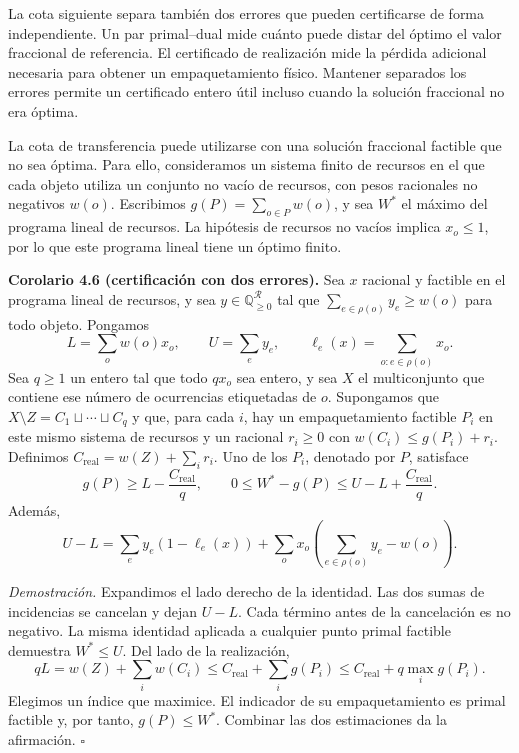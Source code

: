\documentclass[spanish,11pt,a4paper]{article}
\begin{document}
La cota siguiente separa también dos errores que pueden certificarse de
forma independiente. Un par primal--dual mide cuánto puede distar del
óptimo el valor fraccional de referencia. El certificado de realización
mide la pérdida adicional necesaria para obtener un empaquetamiento
físico. Mantener separados los errores permite un certificado entero
útil incluso cuando la solución fraccional no era óptima.

La cota de transferencia puede utilizarse con una solución fraccional
factible que no sea óptima. Para ello, consideramos un sistema finito de
recursos en el que cada objeto utiliza un conjunto no vacío de recursos,
con pesos racionales no negativos \(w(o)\). Escribimos
\(g(P)=\sum_{o\in P}w(o)\), y sea \(W^*\) el máximo del programa lineal
de recursos. La hipótesis de recursos no vacíos implica \(x_o\le1\), por
lo que este programa lineal tiene un óptimo finito.

\textbf{Corolario 4.6 (certificación con dos errores).} Sea \(x\)
racional y factible en el programa lineal de recursos, y sea
\(y\in\mathbb Q_{\ge0}^{\mathcal R}\) tal que
\(\sum_{e\in\rho(o)}y_e\ge w(o)\) para todo objeto. Pongamos \[
L=\sum_o w(o)x_o,\qquad U=\sum_e y_e,
\qquad \ell_e(x)=\sum_{o:e\in\rho(o)}x_o.
\] Sea \(q\ge1\) un entero tal que todo \(qx_o\) sea entero, y sea \(X\)
el multiconjunto que contiene ese número de ocurrencias etiquetadas de
\(o\). Supongamos que \(X\setminus Z=C_1\sqcup\cdots\sqcup C_q\) y que,
para cada \(i\), hay un empaquetamiento factible \(P_i\) en este mismo
sistema de recursos y un racional \(r_i\ge0\) con
\(w(C_i)\le g(P_i)+r_i\). Definimos
\(C_{\mathrm{real}}=w(Z)+\sum_i r_i\). Uno de los \(P_i\), denotado por
\(P\), satisface \[
g(P)\ge L-\frac{C_{\mathrm{real}}}{q},
\qquad
0\le W^*-g(P)\le U-L+\frac{C_{\mathrm{real}}}{q}.
\] Además, \[
U-L=\sum_e y_e(1-\ell_e(x))
 +\sum_o x_o\left(\sum_{e\in\rho(o)}y_e-w(o)\right).
\]

\emph{Demostración.} Expandimos el lado derecho de la identidad. Las dos
sumas de incidencias se cancelan y dejan \(U-L\). Cada término antes de
la cancelación es no negativo. La misma identidad aplicada a cualquier
punto primal factible demuestra \(W^*\le U\). Del lado de la
realización, \[
qL=w(Z)+\sum_i w(C_i)
\le C_{\mathrm{real}}+\sum_i g(P_i)
\le C_{\mathrm{real}}+q\max_i g(P_i).
\] Elegimos un índice que maximice. El indicador de su empaquetamiento
es primal factible y, por tanto, \(g(P)\le W^*\). Combinar las dos
estimaciones da la afirmación. \(\square\)
\end{document}
